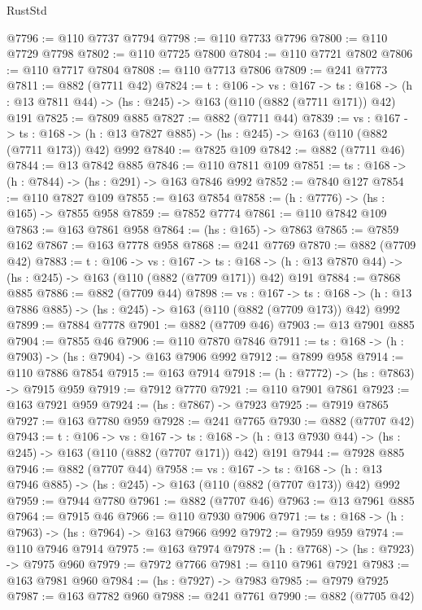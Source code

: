 \begin{lexlean}{RustStd}
\begin{coremodule}
@7796 := @110 @7737 @7794
@7798 := @110 @7733 @7796
@7800 := @110 @7729 @7798
@7802 := @110 @7725 @7800
@7804 := @110 @7721 @7802
@7806 := @110 @7717 @7804
@7808 := @110 @7713 @7806
@7809 := @241 @7773
@7811 := @882 (@7711 @42)
@7824 := {t : @106} ->
  {vs : @167} ->
  {ts : @168} -> (h : @13 @7811 @44) -> (hs : @245) -> @163 (@110 (@882 (@7711 @171)) @42) @191
@7825 := @7809 @885
@7827 := @882 (@7711 @44)
@7839 := {vs : @167} ->
  {ts : @168} -> (h : @13 @7827 @885) -> (hs : @245) -> @163 (@110 (@882 (@7711 @173)) @42) @992
@7840 := @7825 @109
@7842 := @882 (@7711 @46)
@7844 := @13 @7842 @885
@7846 := @110 @7811 @109
@7851 := {ts : @168} -> (h : @7844) -> (hs : @291) -> @163 @7846 @992
@7852 := @7840 @127
@7854 := @110 @7827 @109
@7855 := @163 @7854
@7858 := (h : @7776) -> (hs : @165) -> @7855 @958
@7859 := @7852 @7774
@7861 := @110 @7842 @109
@7863 := @163 @7861 @958
@7864 := (hs : @165) -> @7863
@7865 := @7859 @162
@7867 := @163 @7778 @958
@7868 := @241 @7769
@7870 := @882 (@7709 @42)
@7883 := {t : @106} ->
  {vs : @167} ->
  {ts : @168} -> (h : @13 @7870 @44) -> (hs : @245) -> @163 (@110 (@882 (@7709 @171)) @42) @191
@7884 := @7868 @885
@7886 := @882 (@7709 @44)
@7898 := {vs : @167} ->
  {ts : @168} -> (h : @13 @7886 @885) -> (hs : @245) -> @163 (@110 (@882 (@7709 @173)) @42) @992
@7899 := @7884 @7778
@7901 := @882 (@7709 @46)
@7903 := @13 @7901 @885
@7904 := @7855 @46
@7906 := @110 @7870 @7846
@7911 := {ts : @168} -> (h : @7903) -> (hs : @7904) -> @163 @7906 @992
@7912 := @7899 @958
@7914 := @110 @7886 @7854
@7915 := @163 @7914
@7918 := (h : @7772) -> (hs : @7863) -> @7915 @959
@7919 := @7912 @7770
@7921 := @110 @7901 @7861
@7923 := @163 @7921 @959
@7924 := (hs : @7867) -> @7923
@7925 := @7919 @7865
@7927 := @163 @7780 @959
@7928 := @241 @7765
@7930 := @882 (@7707 @42)
@7943 := {t : @106} ->
  {vs : @167} ->
  {ts : @168} -> (h : @13 @7930 @44) -> (hs : @245) -> @163 (@110 (@882 (@7707 @171)) @42) @191
@7944 := @7928 @885
@7946 := @882 (@7707 @44)
@7958 := {vs : @167} ->
  {ts : @168} -> (h : @13 @7946 @885) -> (hs : @245) -> @163 (@110 (@882 (@7707 @173)) @42) @992
@7959 := @7944 @7780
@7961 := @882 (@7707 @46)
@7963 := @13 @7961 @885
@7964 := @7915 @46
@7966 := @110 @7930 @7906
@7971 := {ts : @168} -> (h : @7963) -> (hs : @7964) -> @163 @7966 @992
@7972 := @7959 @959
@7974 := @110 @7946 @7914
@7975 := @163 @7974
@7978 := (h : @7768) -> (hs : @7923) -> @7975 @960
@7979 := @7972 @7766
@7981 := @110 @7961 @7921
@7983 := @163 @7981 @960
@7984 := (hs : @7927) -> @7983
@7985 := @7979 @7925
@7987 := @163 @7782 @960
@7988 := @241 @7761
@7990 := @882 (@7705 @42)

\end{coremodule}
\end{lexlean}
